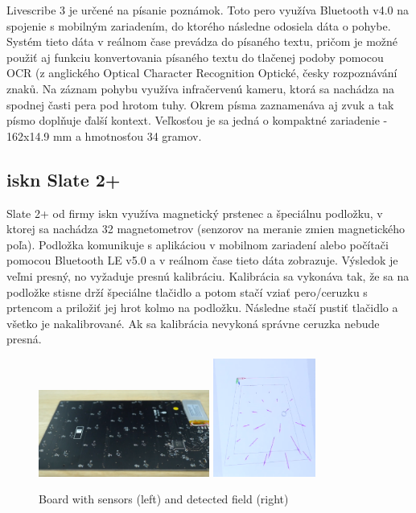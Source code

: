 Livescribe 3 je určené na písanie poznámok. Toto pero využíva Bluetooth v4.0 na spojenie s mobilným zariadením, do ktorého následne odosiela dáta o pohybe. Systém tieto dáta v reálnom čase prevádza do písaného textu, pričom je možné použiť aj funkciu konvertovania písaného textu do tlačenej podoby pomocou OCR (z anglického Optical Character Recognition Optické, česky rozpoznávání znaků. Na záznam pohybu využíva infračervenú kameru, ktorá sa nachádza na spodnej časti pera pod hrotom tuhy. Okrem písma zaznamenáva aj zvuk a tak písmo doplňuje ďalší kontext. Veľkosťou je sa jedná o kompaktné zariadenie - 162x14.9 mm a hmotnosťou 34 gramov.\newline

\subsection*{iskn Slate 2+}

Slate 2+ od firmy iskn využíva magnetický prstenec a špeciálnu podložku, v ktorej sa nachádza 32 magnetometrov (senzorov na meranie zmien magnetického poľa). Podložka komunikuje s aplikáciou v mobilnom zariadení alebo počítači pomocou Bluetooth LE v5.0 a v reálnom čase tieto dáta zobrazuje. Výsledok je veľmi presný, no vyžaduje presnú kalibráciu. Kalibrácia sa vykonáva tak, že sa na podložke stisne drží špeciálne tlačidlo a potom stačí vziať pero/ceruzku s prtencom a priložiť jej hrot kolmo na podložku. Následne stačí pustiť tlačidlo a všetko je nakalibrované. Ak sa kalibrácia nevykoná správne ceruzka nebude presná.\newline

\begin{figure}[hbt]
	\centering
	\includegraphics[width=0.5\textwidth]{obrazky-figures/isknBoard.png}
	\includegraphics[width=0.3\textwidth]{obrazky-figures/isknMagneticfield.png}
	\caption{Board with sensors (left) and detected field (right)}
	\label{ISKN}
\end{figure}

